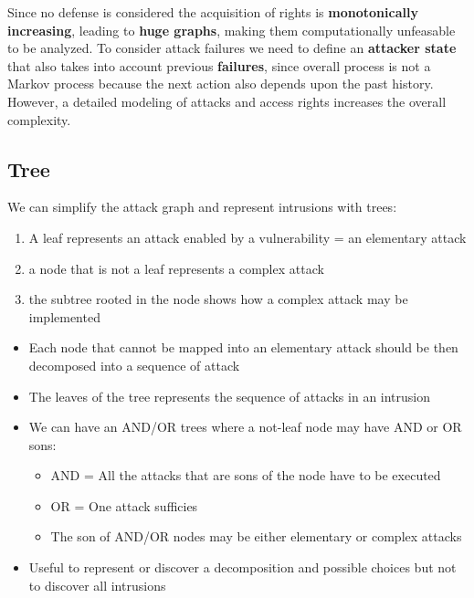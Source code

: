 Since no defense is considered the acquisition of rights is \textbf{monotonically increasing},
leading to \textbf{huge graphs}, making them computationally unfeasable to be analyzed.
To consider attack failures we need to define an \textbf{attacker state} that also takes into account previous \textbf{failures},
since overall process is not a Markov process because the next action also
depends upon the past history.
However, a detailed modeling of attacks and access rights increases the overall complexity.

\subsection{Tree}

We can simplify the attack graph and represent intrusions with trees:
\begin{enumerate}
   \item A leaf represents an attack enabled by a vulnerability = an elementary attack
   \item a node that is not a leaf represents a complex attack
   \item the subtree rooted in the node shows how a complex attack may be implemented
\end{enumerate}

\begin{itemize}
   \item Each node that cannot be mapped into an elementary attack should be then
   decomposed into a sequence of attack
   \item The leaves of the tree represents the sequence of attacks in an intrusion
   \item We can have an AND/OR trees where a not-leaf node may have AND or OR sons:
   \begin{itemize}
      \item AND = All the attacks that are sons of the node have to be executed
      \item OR = One attack sufficies
      \item The son of AND/OR nodes may be either elementary or complex attacks
   \end{itemize}
   \item Useful to represent or discover a decomposition and possible choices but not to
   discover all intrusions
\end{itemize}

